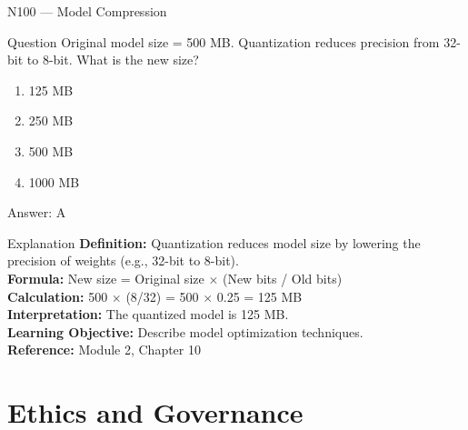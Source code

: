 \documentclass[aspectratio=169,8pt]{beamer}
\begin{document}
	\begin{frame}{N100 --- Model Compression}
		\begin{block}{Question}
			Original model size = 500 MB. Quantization reduces precision from 32-bit to 8-bit. What is the new size?
			\begin{enumerate}
				\item 125 MB
				\item 250 MB
				\item 500 MB
				\item 1000 MB
			\end{enumerate}
		\end{block}
		\begin{exampleblock}{Answer: A}\end{exampleblock}
		\begin{block}{Explanation}
			\textbf{Definition:} Quantization reduces model size by lowering the precision of weights (e.g., 32-bit to 8-bit).\\
			\textbf{Formula:} New size = Original size $\times$ (New bits / Old bits)\\
			\textbf{Calculation:} 500 $\times$ (8/32) = 500 $\times$ 0.25 = 125 MB\\
			\textbf{Interpretation:} The quantized model is 125 MB.\\
			\textbf{Learning Objective:} Describe model optimization techniques.\\
			\textbf{Reference:} Module 2, Chapter 10
		\end{block}
	\end{frame}
	
	\section{Ethics and Governance}
	
\end{document}
